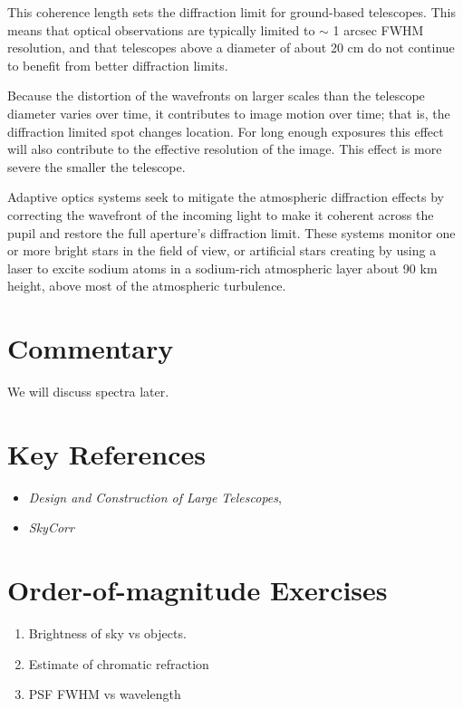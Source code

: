 This coherence length sets the diffraction limit for ground-based
telescopes. This means that optical observations are typically limited
to $\sim$ 1 arcsec FWHM resolution, and that telescopes above a
diameter of about 20 cm do not continue to benefit from better
diffraction limits.  

Because the distortion of the wavefronts on larger scales than the
telescope diameter varies over time, it contributes to image motion
over time; that is, the diffraction limited spot changes location. For
long enough exposures this effect will also contribute to the
effective resolution of the image. This effect is more severe the
smaller the telescope.

Adaptive optics systems seek to mitigate the atmospheric diffraction
effects by correcting the wavefront of the incoming light to make it
coherent across the pupil and restore the full aperture's diffraction
limit. These systems monitor one or more bright stars in the field of
view, or artificial stars creating by using a laser to excite sodium
atoms in a sodium-rich atmospheric layer about 90 km height, above
most of the atmospheric turbulence. 

\section{Commentary}

We will discuss spectra later. 

\section{Key References}

\begin{itemize}
  \item
    {\it Design and Construction of Large Telescopes},
      \citet{bely}
  \item
    {\it SkyCorr}
\end{itemize}

\citet{gunn06a}

\section{Order-of-magnitude Exercises}

\begin{enumerate} 
\item Brightness of sky vs objects.
\item Estimate of chromatic refraction 
\item PSF FWHM vs wavelength
\end{enumerate} 

